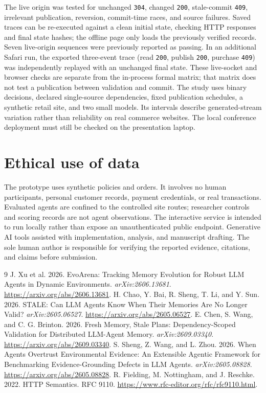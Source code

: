 \documentclass[sigconf,screen,review]{acmart}
\begin{document}
The live origin was tested for unchanged \texttt{304}, changed
\texttt{200}, stale-commit \texttt{409}, irrelevant publication, reversion,
commit-time races, and source failures. Saved traces can be re-executed
against a clean initial state, checking HTTP responses and final state
hashes; the offline page only loads the previously verified records.
Seven live-origin sequences were previously reported as passing. In an
additional Safari run, the exported three-event trace (read \texttt{200},
publish \texttt{200}, purchase \texttt{409}) was independently replayed
with an unchanged final state. These live-socket and browser checks are
separate from the in-process formal matrix; that matrix does not test a
publication between validation and commit. The study uses binary decisions,
declared single-source dependencies, fixed publication schedules, a
synthetic retail site, and two small models. Its intervals describe
generated-stream variation rather than reliability on real commerce
websites. The local
conference deployment must still be checked on the presentation laptop.

\section{Ethical use of data}
The prototype uses synthetic policies and orders. It involves no human
participants, personal customer records, payment credentials, or real
transactions. Evaluated agents are confined to the controlled site routes;
researcher controls and scoring records are not agent observations. The
interactive service is intended to run locally rather than expose an
unauthenticated public endpoint.
Generative AI tools assisted with implementation, analysis, and manuscript
drafting. The sole human author is responsible for verifying the reported
evidence, citations, and claims before submission.

\begin{thebibliography}{9}
 J. Xu et al. 2026. EvoArena: Tracking Memory Evolution for Robust LLM Agents in Dynamic Environments. \emph{arXiv:2606.13681}. \url{https://arxiv.org/abs/2606.13681}.
 H. Chao, Y. Bai, R. Sheng, T. Li, and Y. Sun. 2026.
STALE: Can LLM Agents Know When Their Memories Are No Longer Valid?
\emph{arXiv:2605.06527}. \url{https://arxiv.org/abs/2605.06527}.
 E. Chen, S. Wang, and C. G. Brinton. 2026.
Fresh Memory, Stale Plans: Dependency-Scoped Validation for Distributed
LLM-Agent Memory. \emph{arXiv:2609.03340}.
\url{https://arxiv.org/abs/2609.03340}.
 S. Sheng, Z. Wang, and L. Zhou. 2026.
When Agents Overtrust Environmental Evidence: An Extensible Agentic Framework
for Benchmarking Evidence-Grounding Defects in LLM Agents.
\emph{arXiv:2605.08828}. \url{https://arxiv.org/abs/2605.08828}.
 R. Fielding, M. Nottingham, and J. Reschke. 2022.
HTTP Semantics. RFC 9110. \url{https://www.rfc-editor.org/rfc/rfc9110.html}.
\end{thebibliography}
\end{document}
